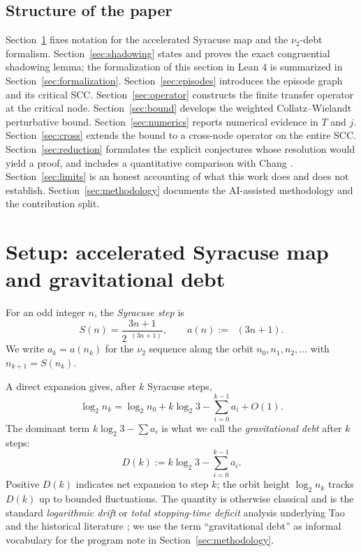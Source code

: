 \documentclass[11pt,a4paper]{article}
\theoremstyle{definition}
\DeclareMathOperator{\nutwo}{\nu_2}
\begin{document}
\subsection{Structure of the paper}
\label{sec:structure}
Section~\ref{sec:setup} fixes notation for the accelerated Syracuse
map and the $\nu_2$-debt formalism. Section~\ref{sec:shadowing}
states and proves the exact congruential shadowing lemma; the
formalization of this section in Lean 4 is summarized in
Section~\ref{sec:formalization}. Section~\ref{sec:episodes}
introduces the episode graph and its critical SCC.
Section~\ref{sec:operator} constructs the finite transfer operator
at the critical node. Section~\ref{sec:bound} develops the weighted
Collatz--Wielandt perturbative bound. Section~\ref{sec:numerics}
reports numerical evidence in $T$ and $j$. Section~\ref{sec:cross}
extends the bound to a cross-node operator on the entire SCC.
Section~\ref{sec:reduction} formulates the explicit conjectures
whose resolution would yield a proof, and includes a quantitative
comparison with Chang \cite{chang2026}. Section~\ref{sec:limits}
is an honest accounting of what this work does and does not
establish. Section~\ref{sec:methodology} documents the AI-assisted
methodology and the contribution split.

\section{Setup: accelerated Syracuse map and gravitational debt}
\label{sec:setup}

For an odd integer $n$, the \emph{Syracuse step} is
\[
S(n) = \frac{3n+1}{2^{\nutwo(3n+1)}},
\qquad
a(n) := \nutwo(3n+1).
\]
We write $a_k = a(n_k)$ for the $\nu_2$ sequence along the orbit
$n_0, n_1, n_2, \ldots$ with $n_{k+1} = S(n_k)$.

A direct expansion gives, after $k$ Syracuse steps,
\[
\log_2 n_k = \log_2 n_0 + k \log_2 3 - \sum_{i=0}^{k-1} a_i + O(1).
\]
The dominant term $k \log_2 3 - \sum a_i$ is what we call the
\emph{gravitational debt} after $k$ steps:
\[
D(k) := k \log_2 3 - \sum_{i=0}^{k-1} a_i.
\]
Positive $D(k)$ indicates net expansion to step $k$; the orbit
height $\log_2 n_k$ tracks $D(k)$ up to bounded fluctuations. The
quantity is otherwise classical and is the standard
\emph{logarithmic drift} or \emph{total stopping-time deficit}
analysis underlying Tao \cite{tao2019} and the historical
literature \cite{lagarias1985,lagarias2010,inselmann2024}; we use
the term ``gravitational debt'' as informal vocabulary for the
program note in Section~\ref{sec:methodology}.
\end{document}
